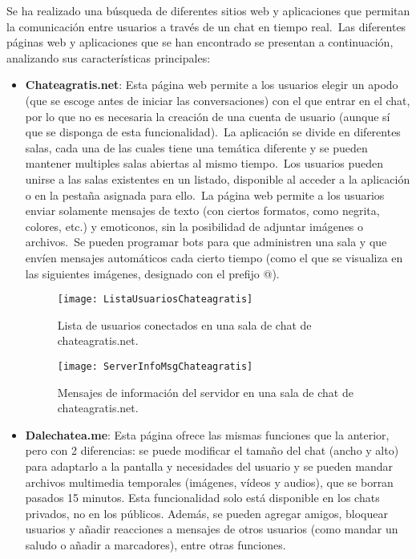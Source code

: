
Se ha realizado una búsqueda de diferentes sitios web y aplicaciones que permitan la comunicación entre usuarios a
través de un chat en tiempo real.\ Las diferentes páginas web y aplicaciones que se han encontrado se presentan a
continuación, analizando sus características principales:

\begin{itemize}
	\item \textbf{Chateagratis.net}: Esta página web permite a los usuarios elegir un apodo (que se escoge antes de
	iniciar las conversaciones) con el que entrar en el chat, por lo que no es necesaria la creación de una cuenta de
	usuario (aunque sí que se disponga de esta funcionalidad).\ La aplicación se divide en diferentes salas, cada una
	de las cuales tiene una temática diferente y se pueden mantener multiples salas abiertas al mismo tiempo.\ Los
	usuarios pueden unirse a las salas existentes en un listado, disponible al acceder a la aplicación o en la pestaña
	asignada para ello.\ La página web permite a los usuarios enviar solamente mensajes de texto (con ciertos
	formatos, como negrita, colores, etc.) y emoticonos, sin la posibilidad de adjuntar imágenes o archivos.\ Se pueden
	programar bots para que administren una sala y que envíen mensajes automáticos cada cierto tiempo (como el que
	se visualiza en las siguientes imágenes, designado con el prefijo @).

	\begin{figure}[H]
		\centering
		\texttt{[image: ListaUsuariosChateagratis]}
		\caption{Lista de usuarios conectados en una sala de chat de chateagratis.net.}
		\label{fig:ListaUsuariosChateagratis}
	\end{figure}

	\begin{figure}[H]
		\centering
		\texttt{[image: ServerInfoMsgChateagratis]}
		\caption{Mensajes de información del servidor en una sala de chat de chateagratis.net.}
		\label{fig:ServerInfoMsgChateagratis}
	\end{figure}

	\item \textbf{Dalechatea.me}: Esta página ofrece las mismas funciones que la anterior, pero con 2 diferencias: se
	puede modificar el tamaño del chat (ancho y alto) para adaptarlo a la pantalla y necesidades del usuario y se
	pueden mandar archivos multimedia temporales (imágenes, vídeos y audios), que se borran pasados 15 minutos.
	Esta funcionalidad solo está disponible en los chats privados, no en los públicos.
	Además, se pueden agregar amigos, bloquear usuarios y añadir reacciones a mensajes de otros usuarios (como mandar
	un saludo o añadir a marcadores), entre otras funciones.


\end{itemize}
